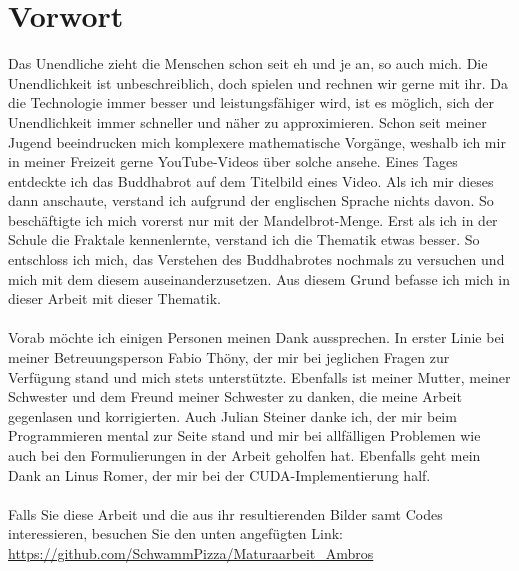 \section*{Vorwort}
Das Unendliche zieht die Menschen schon seit eh und je an, so auch mich. Die Unendlichkeit ist unbeschreiblich, doch spielen und rechnen wir gerne mit ihr. Da die Technologie immer besser und leistungsfähiger wird, ist es möglich, sich der Unendlichkeit immer schneller und näher zu approximieren. Schon seit meiner Jugend beeindrucken mich komplexere mathematische Vorgänge, weshalb ich mir in meiner Freizeit gerne YouTube-Videos über solche ansehe. Eines Tages entdeckte ich das Buddhabrot auf dem Titelbild eines Video. Als ich mir dieses dann anschaute, verstand ich aufgrund der englischen Sprache nichts davon. So beschäftigte ich mich vorerst nur mit der Mandelbrot-Menge. Erst als ich in der Schule die Fraktale kennenlernte, verstand ich die Thematik etwas besser. So entschloss ich mich, das Verstehen des Buddhabrotes nochmals zu versuchen und mich mit dem diesem auseinanderzusetzen. Aus diesem Grund befasse ich mich in dieser Arbeit mit dieser Thematik.\\
\\
Vorab möchte ich einigen Personen meinen Dank aussprechen. In erster Linie bei meiner Betreuungsperson Fabio Thöny, der mir bei jeglichen Fragen zur Verfügung stand und mich stets unterstützte. Ebenfalls ist meiner Mutter, meiner Schwester und dem Freund meiner Schwester zu danken, die meine Arbeit gegenlasen und korrigierten. Auch Julian Steiner danke ich, der mir beim Programmieren mental zur Seite stand und mir bei allfälligen Problemen wie auch bei den Formulierungen in der Arbeit geholfen hat. Ebenfalls geht mein Dank an Linus Romer, der mir bei der CUDA-Implementierung half.\\
\\
Falls Sie diese Arbeit und die aus ihr resultierenden Bilder samt Codes interessieren, besuchen Sie den unten angefügten Link:\\ 
\url{https://github.com/SchwammPizza/Maturaarbeit_Ambros}